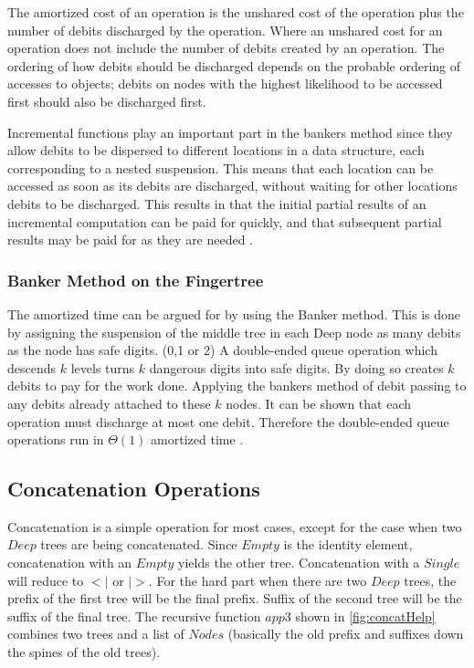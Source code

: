 The amortized cost of an operation is the unshared cost of the operation
plus the number of debits discharged by the operation. Where an unshared cost
for an operation does not include the number of debits created by an operation.
The ordering of how debits should be discharged depends on the probable ordering
of accesses to objects; debits on nodes with the highest likelihood to be accessed
first should also be discharged first.

Incremental functions play an important part in the bankers method since
they allow debits to be dispersed to different locations in a data structure,
each corresponding to a nested suspension. This means that each location can be
accessed as soon as its debits are discharged, without waiting for other
locations debits to be discharged. This results in that the initial partial
results of an incremental computation can be paid for quickly, and that
subsequent partial results may be paid for as they are needed \cite{Okasaki1999}.

\subsubsection{Banker Method on the Fingertree}
The amortized time can be argued for by using the Banker method.
This is done by assigning the suspension of the middle tree in each Deep node
as many debits as the node has safe digits. (0,1 or 2) A double-ended queue
operation which descends $k$ levels turns $k$ dangerous digits into safe digits.
By doing so creates $k$ debits to pay for the work done.
Applying the bankers method of debit passing to any debits already attached to
these $k$ nodes. It can be shown that each operation must discharge at most
one debit. Therefore the double-ended queue operations run in $\Theta(1)$
amortized time \cite{fingertree}.


\subsection{Concatenation Operations}
Concatenation is a simple operation for most cases, except for the case when two
$Deep$ trees are being concatenated. Since $Empty$ is the identity element,
concatenation with an $Empty$ yields the other tree. Concatenation with a
$Single$ will reduce to $<|$ or $|>$. For the hard part when there are two
$Deep$ trees, the prefix of the first tree will be the final prefix. Suffix of
the second tree will be the suffix of the final tree. The recursive function
$app3$ shown in \cref{fig:concatHelp} combines two trees and a list of $Nodes$
(basically the old prefix and suffixes down the spines of the old trees).

